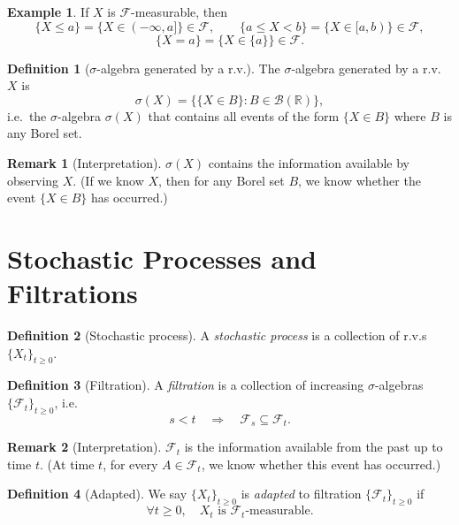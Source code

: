 \documentclass[11pt]{article}
\theoremstyle{definition}
\newtheorem{definition}{Definition}[section]
\newtheorem{example}{Example}[section]
\newtheorem{remark}{Remark}[section]
\begin{document}
\begin{example}
If $X$ is $\mathcal{F}$-measurable, then
\[
  \{X \le a\} = \{X \in (-\infty,a]\} \in \mathcal{F}, \qquad
  \{a \le X < b\} = \{X \in [a,b)\} \in \mathcal{F},
\]
\[
  \{X = a\} = \{X \in \{a\}\} \in \mathcal{F}.
\]
\end{example}

\begin{definition}[$\sigma$-algebra generated by a r.v.]
The $\sigma$-algebra generated by a r.v.\ $X$ is
\[
  \sigma(X) = \bigl\{ \{X \in B\} : B \in \mathcal{B}(\mathbb{R}) \bigr\},
\]
i.e.\ the $\sigma$-algebra $\sigma(X)$ that contains all events of the form
$\{X \in B\}$ where $B$ is any Borel set.
\end{definition}

\begin{remark}[Interpretation]
$\sigma(X)$ contains the information available by observing $X$.
(If we know $X$, then for any Borel set $B$, we know whether the event
$\{X \in B\}$ has occurred.)
\end{remark}

\section{Stochastic Processes and Filtrations}

\begin{definition}[Stochastic process]
A \emph{stochastic process} is a collection of r.v.s $\{X_t\}_{t \ge 0}$.
\end{definition}

\begin{definition}[Filtration]
A \emph{filtration} is a collection of increasing $\sigma$-algebras
$\{\mathcal{F}_t\}_{t \ge 0}$, i.e.
\[
  s < t \quad \Longrightarrow \quad \mathcal{F}_s \subseteq \mathcal{F}_t.
\]
\end{definition}

\begin{remark}[Interpretation]
$\mathcal{F}_t$ is the information available from the past up to time $t$.
(At time $t$, for every $A \in \mathcal{F}_t$, we know whether this event
has occurred.)
\end{remark}

\begin{definition}[Adapted]
We say $\{X_t\}_{t \ge 0}$ is \emph{adapted} to filtration
$\{\mathcal{F}_t\}_{t \ge 0}$ if
\[
  \forall t \ge 0, \quad X_t \text{ is } \mathcal{F}_t\text{-measurable}.
\]
\end{definition}
\end{document}
